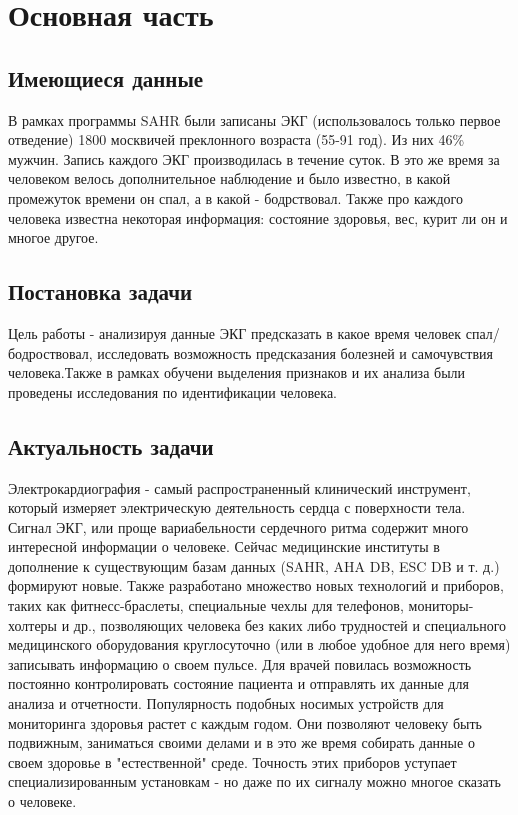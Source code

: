 \chapter{Основная часть}
\section{Имеющиеся данные}
В рамках программы SAHR были записаны ЭКГ (использовалось только первое отведение) 1800 москвичей преклонного возраста (55-91 год). Из них 46\% мужчин. Запись каждого ЭКГ производилась в течение суток. В это же время за человеком велось дополнительное наблюдение и было известно, в какой промежуток времени он спал, а в какой - бодрствовал. Также про каждого человека известна некоторая информация: состояние здоровья, вес, курит ли он и многое другое.
\section{Постановка задачи}

Цель работы - анализируя данные ЭКГ предсказать в какое время человек спал/бодроствовал, исследовать возможность предсказания болезней и самочувствия человека.Также в рамках обучени выделения признаков и их анализа были проведены исследования по идентификации человека.

\section{Актуальность задачи}
Электрокардиография - самый распространенный клинический инструмент, который измеряет электрическую деятельность сердца с поверхности тела. Сигнал ЭКГ, или проще вариабельности сердечного ритма содержит много интересной информации о человеке. Сейчас медицинские институты в дополнение к существующим базам данных (SAHR, AHA DB, ESC DB и т. д.) формируют новые. Также разработано множество новых технологий и приборов, таких как фитнесс-браслеты, специальные чехлы для телефонов, мониторы-холтеры и др., позволяющих человека без каких либо трудностей и специального медицинского оборудования круглосуточно (или в любое удобное для него время) записывать информацию о своем пульсе. Для врачей повилась возможность постоянно контролировать состояние пациента и отправлять их данные  для анализа и отчетности. Популярность подобных носимых устройств для мониторинга здоровья растет с каждым годом. Они позволяют человеку быть подвижным, заниматься своими делами и в это же время собирать данные о своем здоровье в "естественной" среде. Точность этих приборов уступает специализированным установкам - но даже по их сигналу можно многое сказать о человеке. 


